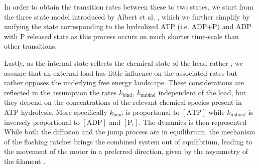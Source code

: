 \documentclass[aps,pre,twocolumn,showpacs,showkeys,superscriptaddress,floatfix]{revtex4-1}
\begin{document}
In order to obtain the transition rates between these to two states, we start from the three state model introduced by Albert et al. \cite{Albert2014},
which we further simplify by unifying the state corresponding to the hydrolized ATP (i.e. ADP+P) and ADP with P released state as this process occurs on much shorter time-scale than other transitions.

Lastly, as the internal state reflects the chemical state of the head rather ,
we assume that an external load has little influence on the associated rates but rather opposes the underlying free energy landscape. 
These considerations are reflected in the assumption the rates $k_\text{bind}$, $k_\text{unbind}$ independent of the load, 
but they depend on the concentrations of the relevant chemical species present in ATP hydrolysis. 
More specifically $k_\text{bind}$ is proportional to $[\text{ATP}]$ while $k_\text{unbind}$ is inversely proportional to $[\text{ADP}]$ and $[\text{P}_\text{i}]$.
The dynamics is then represented While both the diffusion and the jump process are in equilibrium, the mechanism of the flashing ratchet brings the combined system out of equilibrium, leading to the movement of the motor in a preferred direction, given by the asymmetry of the filament \cite{Reimann2002introduction,de2007symmetries}.
\end{document}
